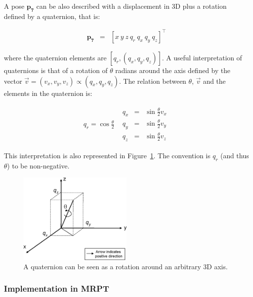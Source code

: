 \documentclass[a4paper,11pt]{report}
\begin{document}
A pose $\mathbf{p_7}$ can be also described with a displacement in 3D plus a rotation 
defined by a quaternion, that is:

\begin{eqnarray}
\mathbf{p_7} &=& [x ~ y ~ z ~  q_r ~ q_x ~ q_y ~ q_z ] ^ \top
\end{eqnarray}

\noindent where the quaternion elements are $[q_r, (q_x,q_y,q_z)]$. A useful interpretation of quaternions
is that of a rotation of $\theta$ radians around the axis defined by the vector $\vec{v} = (v_x,v_y,v_z) \propto (q_x,q_y,q_z)$.
The relation between $\theta$, $\vec{v}$ and the elements in the quaternion is:

\begin{equation*}
\begin{array}{cc}
q_r = \cos\frac{\theta}{2}  &  
  \begin{array}{rcl}
    q_x &=& \sin\frac{\theta}{2} v_x  \\
    q_y &=& \sin\frac{\theta}{2} v_y  \\
    q_z &=& \sin\frac{\theta}{2} v_z  
  \end{array}
\end{array}
\end{equation*}

This interpretation is also represented in Figure~\ref{fig:quat}. 
The convention is $q_r$ (and thus $\theta$) to be non-negative. 


\begin{figure}[h]
\centering
\includegraphics[width=0.50\textwidth]{quaternion.eps}
\caption{A quaternion can be seen as a rotation around an arbitrary 3D axis.}
\label{fig:quat}
\end{figure}


\subsubsection{Implementation in MRPT}
\end{document}
